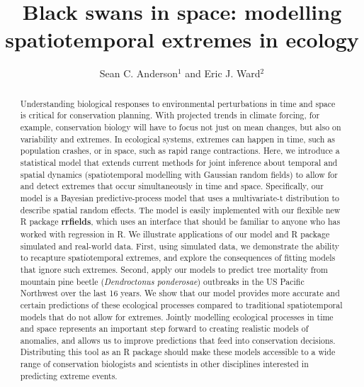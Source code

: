 \documentclass[12pt,english]{article}
\title{Black swans in space: modelling spatiotemporal extremes in ecology}
\author{
Sean C. Anderson$^1$ and
Eric J. Ward$^2$
}
\date{}
\begin{document}
\maketitle

\begin{spacing}{1.5}




\begin{abstract}

Understanding biological responses to environmental perturbations in time and
space is critical for conservation planning. With projected trends in climate
forcing, for example, conservation biology will have to focus not just on mean
changes, but also on variability and extremes. In ecological systems, extremes
can happen in time, such as population crashes, or in space, such as rapid
range contractions. Here, we introduce a statistical model that extends current
methods for joint inference about temporal and spatial dynamics (spatiotemporal
modelling with Gaussian random fields) to allow for and detect extremes that
occur simultaneously in time and space. Specifically, our model is a Bayesian
predictive-process model that uses a multivariate-t distribution to describe
spatial random effects. The model is easily implemented with our flexible new R
package \textbf{rrfields}, which uses an interface that should be familiar to
anyone who has worked with regression in R. We illustrate applications of our
model and R package simulated and real-world data. First, using simulated data,
we demonstrate the ability to recapture spatiotemporal extremes, and explore
the consequences of fitting models that ignore such extremes. Second, apply our
models to predict tree mortality from mountain pine beetle (\emph{Dendroctonus
  ponderosae}) outbreaks in the US Pacific Northwest over the last 16 years.
We show that our model provides more accurate and certain
predictions of these ecological processes compared to traditional
spatiotemporal models that do not allow for extremes. Jointly modelling
ecological processes in time and space represents an important step forward to
creating realistic models of anomalies, and allows us to improve predictions
that feed into conservation decisions. Distributing this tool as an R package
should make these models accessible to a wide range of conservation biologists
and scientists in other disciplines interested in predicting extreme events.
\end{abstract}


\end{spacing}
\end{document}
